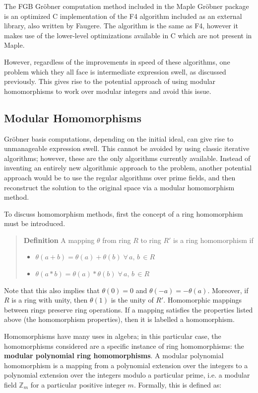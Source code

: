 \documentclass[letterpaper,12pt,titlepage,oneside,final]{book}
\newenvironment{defn}{\begin{quote}%
  \textbf{Definition }%
  \quad
}{%
\end{quote}%
}
\begin{document}
The FGB Gr\"obner computation method included in the Maple Gr\"obner package is an optimized C implementation of the F4 algorithm included as an external library, also written by Faugere.  The algorithm is the same as F4, however it makes use of the lower-level optimizations available in C which are not present in Maple. 

However, regardless of the improvements in speed of these algorithms, one problem which they all face is intermediate expression swell, as discussed previously.  This gives rise to the potential approach of using modular homomorphisms to work over modular integers and avoid this issue.      
 
\subsection{Modular Homomorphisms}

Gr\"obner basis computations, depending on the initial ideal, can give rise to unmanageable expression swell.  This cannot be avoided by using classic iterative algorithms; however, these are the only algorithms currently available.  Instead of inventing an entirely new algorithmic approach to the problem, another potential approach would be to use the regular algorithms over prime fields, and then reconstruct the solution to the original space via a modular homomorphism method.

To discuss homomorphism methods, first the concept of a ring homomorphism must be introduced.

\begin{defn}\label{Homom}
  A mapping $\theta$ from ring ${R}$ to ring ${R'}$ is a ring homomorphism if
  \begin{itemize}
    \item ${\theta(a + b) = \theta(a) + \theta(b) \; \forall \, a, \, b \, \in R}$ 
    \item ${\theta(a * b) = \theta(a) * \theta(b) \; \forall \, a, \, b \, \in R}$ 
  \end{itemize} 
\end{defn}
Note that this also implies that ${\theta(0) = 0}$ and ${\theta(-a) = -\theta(a)}$.  Moreover, if ${R}$ is a ring with unity, then ${\theta(1)}$ is the unity of ${R'}$.  Homomorphic mappings between rings preserve ring operations.  If a mapping satisfies the properties listed above (the homomorphism properties), then it is labelled a homomorphism.

Homomorphisms have many uses in algebra; in this particular case, the homomorphisms considered are a specific instance of ring homomorphisms: the \textbf{modular polynomial ring homomorphisms}.  A modular polynomial homomorphism is a mapping from a polynomial extension over the integers to a polynomial extension over the integers modulo a particular prime, i.e. a modular field ${\mathbb{Z}_m}$ for a particular positive integer ${m}$.  Formally, this is defined as:
\end{document}
